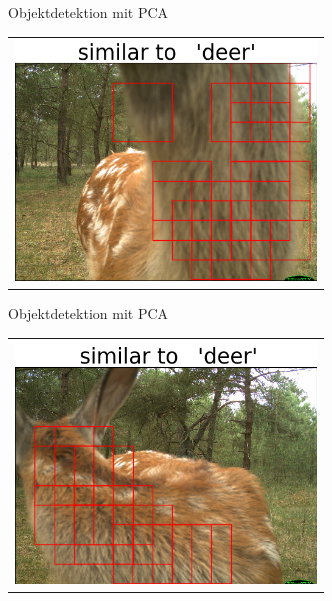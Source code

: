 \begin{frame}[t,fragile]{Objektdetektion mit PCA}
  \vspace{0.01em}
  {
\begin{table}
\centering
        \begin{tabular}{c}
        \includegraphics[width=8cm]{img/Segmentierung/seg(8).png}\\
         \end{tabular}
\end{table}
 }

\end{frame}


\begin{frame}[t,fragile]{Objektdetektion mit PCA}
  \vspace{0.01em}
  {
\begin{table}
\centering
        \begin{tabular}{c}
        \includegraphics[width=8cm]{img/Segmentierung/seg(9).png}
         \end{tabular}
\end{table}
 }

\end{frame}
